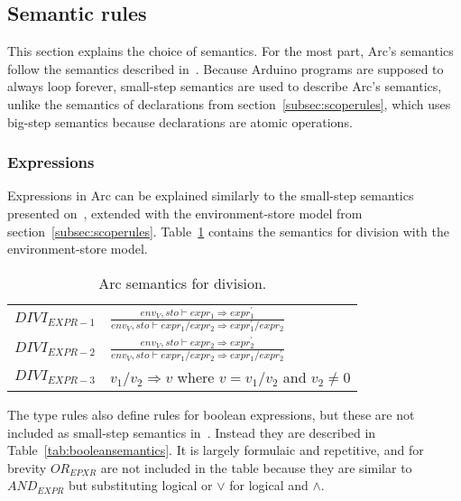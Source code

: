 \subsection{Semantic rules}\label{subsec:semanticrules}
This section explains the choice of semantics. For the most part, Arc's semantics follow the semantics described in~\cite{Huttel2010}. Because Arduino programs are supposed to always loop forever, small-step semantics are used to describe Arc's semantics, unlike the semantics of declarations from section~\ref{subsec:scoperules}, which uses big-step semantics because declarations are atomic operations.

\subsubsection{Expressions}
Expressions in Arc can be explained similarly to the small-step semantics presented on~\cite[p.~37]{Huttel2010}, extended with the environment-store model from section~\ref{subsec:scoperules}. Table~\ref{tab:divisionsemantics} contains the semantics for division with the environment-store model.


\begin{table}[htb!]
    \centering
    \begin{tabular}{ll}
        \toprule
        $DIVI_{EXPR-1}$ & $\frac{env_V, sto \vdash expr_1 \Rightarrow expr^\prime_1}{env_V, sto \vdash expr_1 / expr_2 \Rightarrow expr^\prime_1 / expr_2}$ \\ [12pt]
        $DIVI_{EXPR-2}$ & $\frac{env_V, sto \vdash expr_2 \Rightarrow expr^\prime_2}{env_V, sto \vdash expr_1 / expr_2 \Rightarrow expr_1 / expr^\prime_2}$ \\ [12pt]
        $DIVI_{EXPR-3}$ & $v_1 / v_2 \Rightarrow v$ where $v =v_1 / v_2$ and $v_2 \neq 0$                                                                   \\
        \bottomrule
    \end{tabular}
    \caption{Arc semantics for division.}
    \label{tab:divisionsemantics}
\end{table}


The type rules also define rules for boolean expressions, but these are not included as small-step semantics in~\cite{Huttel2010}. Instead they are described in Table~\ref{tab:booleansemantics}. It is largely formulaic and repetitive, and for brevity $OR_{EPXR}$ are not included in the table because they are similar to $AND_{EXPR}$ but substituting logical or $\lor$ for logical and $\land$.


